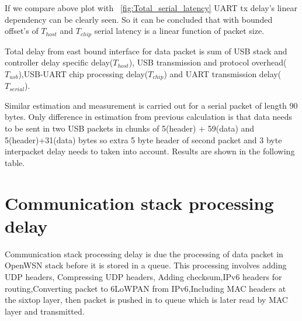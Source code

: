 If we compare above plot with ~\ref{fig:Total_serial_latency} UART tx delay's linear dependency can be clearly seen. So it can be concluded that with bounded offset's of $T_{host}$  and $T_{chip}$ serial latency is a linear function of packet size.

Total delay from east bound interface for data packet is sum of USB stack and controller delay specific  delay($T_{host}$), USB transmission and protocol overhead($T_{usb}$),USB-UART chip processing delay($T_{chip}$) and UART transmission delay($T_{serial}$).

Similar estimation and measurement is carried out for a serial packet of length 90 bytes.
Only difference in estimation from previous calculation is that data needs to be sent in two USB packets in chunks of 5(header) + 59(data) and 5(header)+31(data) bytes so extra 5 byte header of second packet and 3 byte interpacket delay needs to taken into account. Results are shown in the following table.


\section{Communication stack processing delay}
Communication stack  processing delay is due the processing of data packet in OpenWSN stack before it is stored in a queue. This processing involves adding UDP headers, Compressing UDP headers, Adding checksum,IPv6 headers for routing,Converting packet to 6LoWPAN from IPv6,Including MAC headers at the sixtop layer, then packet is pushed in to queue which is later read by MAC layer and transmitted.

